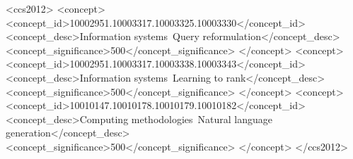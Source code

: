\documentclass[sigconf,natbib=true,anonymous=false]{acmart}
\begin{document}
\begin{abstract}


\end{abstract}

\begin{CCSXML}
<ccs2012>
   <concept>
       <concept_id>10002951.10003317.10003325.10003330</concept_id>
       <concept_desc>Information systems~Query reformulation</concept_desc>
       <concept_significance>500</concept_significance>
       </concept>
   <concept>
       <concept_id>10002951.10003317.10003338.10003343</concept_id>
       <concept_desc>Information systems~Learning to rank</concept_desc>
       <concept_significance>500</concept_significance>
       </concept>
   <concept>
       <concept_id>10010147.10010178.10010179.10010182</concept_id>
       <concept_desc>Computing methodologies~Natural language generation</concept_desc>
       <concept_significance>500</concept_significance>
       </concept>
 </ccs2012>
\end{CCSXML}


\end{document}
